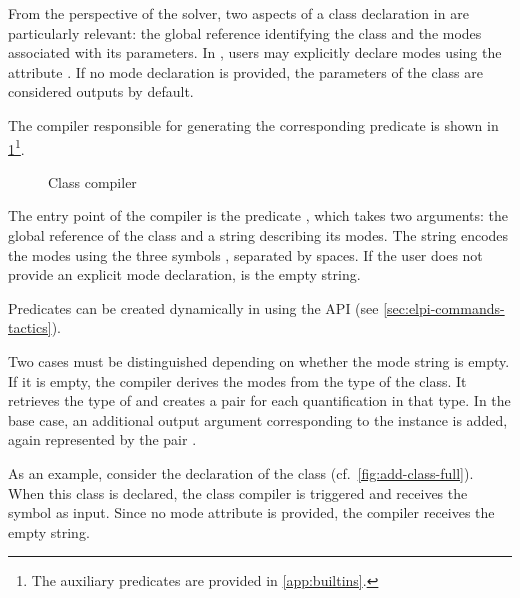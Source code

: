 From the perspective of the \elpi solver, two aspects of a class declaration in
\rocq are particularly relevant: the global reference identifying the class and
the modes associated with its parameters. In \rocq, users may explicitly
declare modes using the attribute \cI{~\#~[mode="..."]}. If no mode declaration
is provided, the parameters of the class are considered outputs by default.

The compiler responsible for generating the corresponding \elpi predicate is
shown in \cref{fig:class-compiler}\footnote{The auxiliary
predicates are provided in \cref{app:builtins}.}.

\begin{figure}
  
  \caption{Class compiler}
  \label{fig:class-compiler}
\end{figure}

The entry point of the compiler is the predicate , which
takes two arguments: the global reference  of the class and a string
 describing its modes. The string  encodes the modes using the
three \rocq symbols \cI{-, +, !}, separated by spaces. If the user does not
provide an explicit mode declaration,  is the empty string.

Predicates can be created dynamically in \elpi using the API
 (see \cref{sec:elpi-commands-tactics}). 

Two cases must be distinguished depending on whether the mode string is
empty. If it is empty, the compiler derives the modes from the type of the
class. It retrieves the type of  and creates a pair  for
each quantification in that type. In the base case, an additional output
argument corresponding to the instance is added, again represented by the pair
.

As an example, consider the declaration of the class 
(cf.~\cref{fig:add-class-full}). When this class is declared, the \elpi class
compiler is triggered and receives the \rocq symbol  as input.
Since no mode attribute is provided, the compiler receives the empty string.

